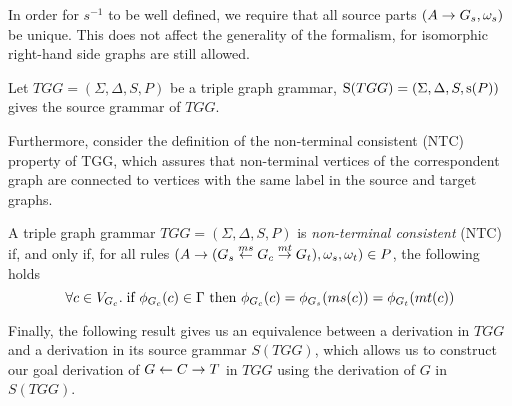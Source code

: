 In order for $s^{-1}$ to be well defined, we require that all source parts $(A \pro G_s,\omega_s)$ be unique. This does not affect the generality of the formalism, for isomorphic right-hand side graphs are still allowed.

\begin{definition}
	\label{def:Source}
	Let $TGG = (\Sigma, \Delta, S, P)$ be a triple graph grammar, $\Source(TGG) = (\Sigma, \Delta, S, \source(P))$ gives the source grammar of $TGG$.
\end{definition}

Furthermore, consider the definition of the non-terminal consistent (NTC) property of TGG, which assures that non-terminal vertices of the correspondent graph are connected to vertices with the same label in the source and target graphs.

\begin{definition}
	A triple graph grammar $TGG = (\Sigma, \Delta, S, P)$ is \emph{non-terminal consistent} (NTC) if, and only if, for all rules $(A \pro (G_s \ms{ms} G_c \mt{mt} G_t), \omega_s, \omega_t) \in P$, the following holds
	\begin{equation*}
		\forall c \in V_{G_c} \. \text{if } \phi_{G_c}(c) \in \Gamma \text{ then } \phi_{G_c}(c) = \phi_{G_s}(ms(c)) = \phi_{G_t}(mt(c))
	\end{equation*}
\end{definition}

Finally, the following result gives us an equivalence between a derivation in $TGG$ and a derivation in its source grammar $S(TGG)$, which allows us to construct our goal derivation of $G \ms{} C \mt{} T$ in $TGG$ using the derivation of $G$ in $S(TGG)$.

